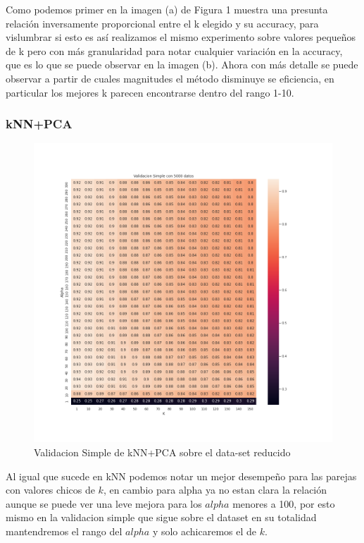 \documentclass[a4paper,10pt]{article}
\begin{document}
\par

Como podemos primer en la imagen (a) de Figura 1 muestra una presunta relación inversamente proporcional entre el k elegido y su accuracy, para vislumbrar si esto es así realizamos el mismo experimento sobre valores pequeños de k pero con más granularidad para notar cualquier variación en la accuracy, que es lo que se puede observar en la imagen (b). Ahora con más detalle se puede observar a partir de cuales magnitudes el método disminuye se eficiencia, en particular los mejores k parecen encontrarse dentro del rango 1-10.

\subsubsection{kNN+PCA}

\begin{figure}[H]
    \centering
    \includegraphics[width=12cm]{../images/validacionSimple_heatmap_datasetRedux}%
    \qquad
    \caption{Validacion Simple de kNN+PCA sobre el data-set reducido}
    \label{knnpca_preliminar}%
\end{figure}

Al igual que sucede en kNN podemos notar un mejor desempeño para las parejas con valores chicos de $k$, en cambio para alpha ya no estan clara la relación aunque se puede ver una leve mejora para los $alpha$ menores a 100, por esto mismo en la validacion simple que sigue sobre el dataset en su totalidad mantendremos el rango del $alpha$ y solo achicaremos el de $k$.
\end{document}
